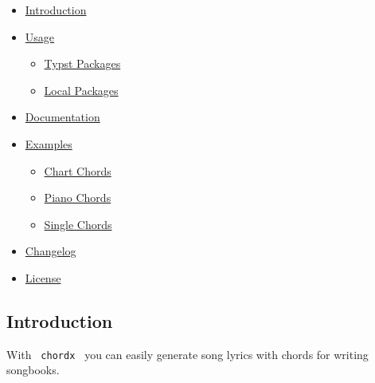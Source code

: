 \begin{itemize}
\tightlist
\item
  \href{https://github.com/typst/packages/raw/main/packages/preview/chordx/0.5.0/\#introduction}{Introduction}
\item
  \href{https://github.com/typst/packages/raw/main/packages/preview/chordx/0.5.0/\#usage}{Usage}

  \begin{itemize}
  \tightlist
  \item
    \href{https://github.com/typst/packages/raw/main/packages/preview/chordx/0.5.0/\#typst-packages}{Typst
    Packages}
  \item
    \href{https://github.com/typst/packages/raw/main/packages/preview/chordx/0.5.0/\#local-packages}{Local
    Packages}
  \end{itemize}
\item
  \href{https://github.com/typst/packages/raw/main/packages/preview/chordx/0.5.0/\#documentation}{Documentation}
\item
  \href{https://github.com/typst/packages/raw/main/packages/preview/chordx/0.5.0/\#examples}{Examples}

  \begin{itemize}
  \tightlist
  \item
    \href{https://github.com/typst/packages/raw/main/packages/preview/chordx/0.5.0/\#chart-chords}{Chart
    Chords}
  \item
    \href{https://github.com/typst/packages/raw/main/packages/preview/chordx/0.5.0/\#piano-chords}{Piano
    Chords}
  \item
    \href{https://github.com/typst/packages/raw/main/packages/preview/chordx/0.5.0/\#single-chords}{Single
    Chords}
  \end{itemize}
\item
  \href{https://github.com/typst/packages/raw/main/packages/preview/chordx/0.5.0/\#changelog}{Changelog}
\item
  \href{https://github.com/typst/packages/raw/main/packages/preview/chordx/0.5.0/\#license}{License}
\end{itemize}

\subsection{Introduction}\label{introduction}

With \texttt{\ chordx\ } you can easily generate song lyrics with chords
for writing songbooks.

